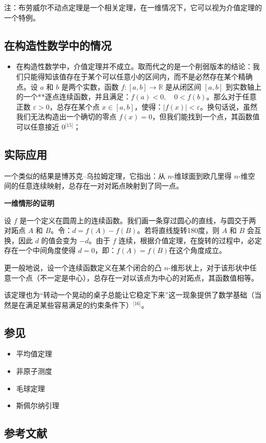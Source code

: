 注：布劳威尔不动点定理是一个相关定理，在一维情况下，它可以视为介值定理的一个特例。
\subsection{在构造性数学中的情况}
\begin{itemize}
\item 在构造性数学中，介值定理并不成立。取而代之的是一个削弱版本的结论：我们只能得知该值存在于某个可以任意小的区间内，而不是必然存在某个精确点。设 $a$ 和 $b$ 是两个实数，函数 $f: [a, b] \to \mathbb{R}$ 是从闭区间 $[a, b]$ 到实数轴上的一个**逐点连续函数，并且满足：$f(a) < 0,\quad 0 < f(b)$。那么对于任意正数 $\varepsilon > 0$，总存在某个点 $x \in [a, b]$，使得：$|f(x)| < \varepsilon$。换句话说，虽然我们无法构造出一个确切的零点 $f(x) = 0$，但我们能找到一个点，其函数值可以任意接近 0\(^\text{[15]}\)；
\end{itemize}
\subsection{实际应用}
一个类似的结果是博苏克–乌拉姆定理，它指出：从 $n$-维球面到欧几里得 $n$-维空间的任意连续映射，总存在一对对跖点映射到了同一点。

\textbf{一维情形的证明}

设 $f$ 是一个定义在圆周上的连续函数。我们画一条穿过圆心的直线，与圆交于两对跖点 $A$ 和 $B$。令：$d = f(A) - f(B)$。若将直线旋转180度，则 $A$ 和 $B$ 会互换，因此 $d$ 的值会变为 $-d$。由于 $f$ 连续，根据介值定理，在旋转的过程中，必定存在一个中间角度使得 $d = 0$，即：$f(A) = f(B)$在这个角度成立。

更一般地说，设一个连续函数定义在某个闭合的凸 $n$-维形状上，对于该形状中任意一个点（不一定是中心），总存在一对以该点为中心的对跖点，其函数值相等。

该定理也为“转动一个晃动的桌子总能让它稳定下来”这一现象提供了数学基础（当然是在满足某些容易满足的约束条件下）\(^\text{[16]}\)。
\subsection{参见}
\begin{itemize}
\item 平均值定理
\item 非原子测度
\item 毛球定理
\item 斯佩尔纳引理
\end{itemize}
\subsection{参考文献}

